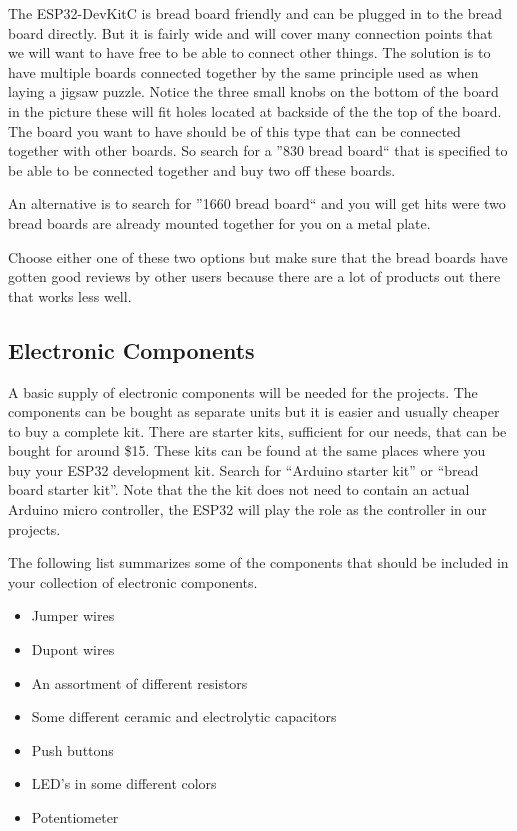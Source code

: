 \documentclass{tufte-book}
\begin{document}
The ESP32-DevKitC is bread board friendly and can be plugged in to the bread board directly. But it is fairly wide and will cover many connection points that we will want to have free to be able to connect other things. The solution is to have multiple boards connected together by the same principle used as when laying a jigsaw puzzle. Notice the three small knobs on the bottom of the board in the picture these will fit holes located at backside of the the top of the board. The board you want to have should be of this type that can be connected together with other boards. So search for a ''830 bread board`` that is specified to be able to be connected together and buy two off these boards. 

An alternative is to search for ''1660 bread board`` and you will get hits were two bread boards are already mounted together for you on a metal plate.

Choose either one of these two options but make sure that the bread boards have gotten good reviews by other users because there are a lot of products out there that works less well. 

\subsection{Electronic Components}
A basic supply of electronic components will be needed for the projects. The components can be bought as separate units but it is easier and usually cheaper to buy a complete kit. There are starter kits, sufficient for our needs, that can be bought for around \$15. These kits can be found at the same places where you buy your ESP32 development kit. Search for ``Arduino starter kit'' or ``bread board starter kit''. Note that the the kit does not need to contain an actual Arduino micro controller, the ESP32 will play the role as the controller in our projects.

The following list summarizes some of the components that should be included in your collection of electronic components.

\begin{itemize}
	\item Jumper wires
	\item Dupont wires
	\item An assortment of different resistors
	\item Some different ceramic and electrolytic capacitors
	\item Push buttons
	\item LED's in some different colors 
	\item Potentiometer
\end{itemize}
\end{document}
